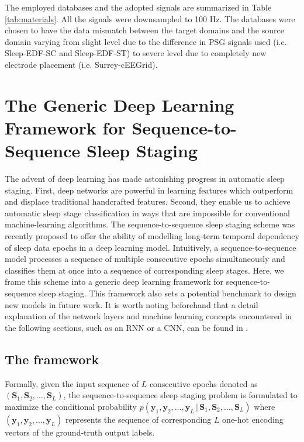 \documentclass[journal,twoside,web]{ieeecolor}
\begin{document}
The employed databases and the adopted signals are summarized in Table \ref{tab:materials}. All the signals were downsampled to 100 Hz. The databases were chosen to have the data mismatch between the target domains and the source domain varying from slight level due to the difference in PSG signals used (i.e. Sleep-EDF-SC and Sleep-EDF-ST) to severe level due to completely new electrode placement (i.e. Surrey-cEEGrid).


\vspace{-0.15cm}
\section{The Generic Deep Learning Framework for Sequence-to-Sequence Sleep Staging}
\label{sec:models}

The advent of deep learning has made astonishing progress in automatic sleep staging. First, deep networks are powerful in learning features which outperform and displace traditional handcrafted features. Second, they enable us to achieve automatic sleep stage classification in ways that are impossible for conventional machine-learning algorithms. The sequence-to-sequence sleep staging scheme \cite{Phan2019a} was recently proposed to offer the ability of modelling long-term temporal dependency of sleep data epochs in a deep learning model. Intuitively, a sequence-to-sequence model processes a sequence of multiple consecutive epochs simultaneously and classifies them at once into a sequence of corresponding sleep stages. Here, we frame this scheme into a generic deep learning framework for sequence-to-sequence sleep staging. This framework also sets a potential benchmark to design new models in future work. It is worth noting beforehand that a detail explanation of the network layers and machine learning concepts encountered in the following sections, such as an RNN or a CNN, can be found in \cite{Goodfellow2016}.

\vspace{-0.2cm}
\subsection{The framework}
\label{sec:framework}

Formally, given the input sequence of $L$ consecutive epochs denoted as $(\mathbf{S}_1, \mathbf{S}_2, \ldots, \mathbf{S}_L)$, the sequence-to-sequence sleep staging problem \cite{Phan2019a} is formulated to maximize the conditional probability 
$p(\mathbf{y}_1, \mathbf{y}_2, \ldots, \mathbf{y}_L \,|\, \mathbf{S}_1, \mathbf{S}_2, \ldots, \mathbf{S}_L)$ where $(\mathbf{y}_1, \mathbf{y}_2, \ldots, \mathbf{y}_L)$ represents the sequence of corresponding $L$ one-hot encoding vectors of the ground-truth output labels.
\end{document}

